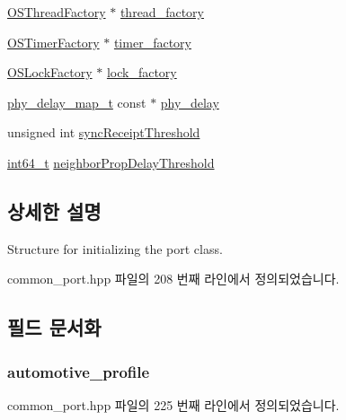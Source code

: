 \begin{DoxyCompactItemize}
\item 
\hyperlink{class_o_s_thread_factory}{O\+S\+Thread\+Factory} $\ast$ \hyperlink{struct_port_init__t_ab7b7aac8859366c067298afbdd810722}{thread\+\_\+factory}
\item 
\hyperlink{class_o_s_timer_factory}{O\+S\+Timer\+Factory} $\ast$ \hyperlink{struct_port_init__t_a985e15d90d12d2c643111f32fa01e07a}{timer\+\_\+factory}
\item 
\hyperlink{class_o_s_lock_factory}{O\+S\+Lock\+Factory} $\ast$ \hyperlink{struct_port_init__t_a58729cd56552f6d66559abd63d013426}{lock\+\_\+factory}
\item 
\hyperlink{common__port_8hpp_a3fdbc1f6eb18af9243571ba14c1e1f63}{phy\+\_\+delay\+\_\+map\+\_\+t} const $\ast$ \hyperlink{struct_port_init__t_a58af31938106f0270af088b7e552d125}{phy\+\_\+delay}
\item 
unsigned int \hyperlink{struct_port_init__t_a503c299642c8353010c3421808b23dc9}{sync\+Receipt\+Threshold}
\item 
\hyperlink{parse_8c_a67a9885ef4908cb72ce26d75b694386c}{int64\+\_\+t} \hyperlink{struct_port_init__t_a96819f2beeb4656c9450bb283845e391}{neighbor\+Prop\+Delay\+Threshold}
\end{DoxyCompactItemize}


\subsection{상세한 설명}
Structure for initializing the port class. 

common\+\_\+port.\+hpp 파일의 208 번째 라인에서 정의되었습니다.



\subsection{필드 문서화}
\subsubsection[{\texorpdfstring{automotive\+\_\+profile}{automotive_profile}}]{ automotive\+\_\+profile}\hypertarget{struct_port_init__t_a915ce34888736844c056a811c96a9e9f}{}\label{struct_port_init__t_a915ce34888736844c056a811c96a9e9f}


common\+\_\+port.\+hpp 파일의 225 번째 라인에서 정의되었습니다.

